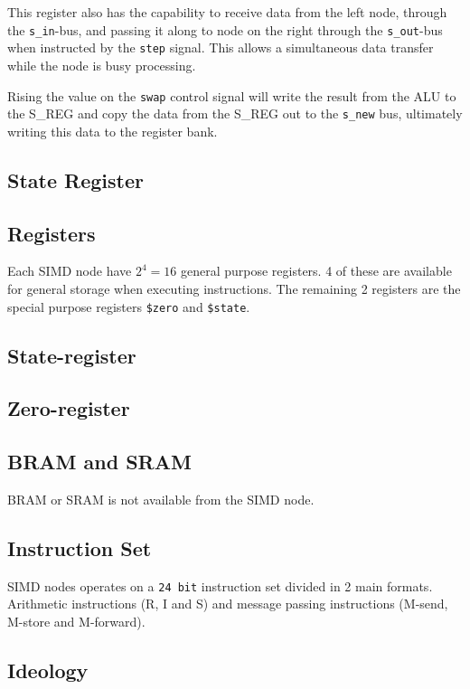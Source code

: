 This register also has the capability to receive data from the left node,
through the {\tt s\_in}-bus, and passing it along to node on the right through
the {\tt s\_out}-bus when instructed by the {\tt step} signal. This allows a
simultaneous data transfer while the node is busy processing.

Rising the value on the {\tt swap} control signal will write the result from the
ALU to the S\_REG and copy the data from the S\_REG out to the {\tt s\_new} bus,
ultimately writing this data to the register bank.

\subsection{State Register}

\subsection{Registers}
Each SIMD node have $2^4 = 16$ general purpose registers. 4 of these are
available for general storage when executing instructions. The remaining 2
registers are the special purpose registers {\tt \$zero} and {\tt \$state}.



\subsection{State-register}

\subsection{Zero-register}

\subsection{BRAM and SRAM}
BRAM or SRAM is not available from the SIMD node.

\subsection{Instruction Set}
SIMD nodes operates on a {\tt 24 bit} instruction set divided in 2 main
formats. Arithmetic instructions (R, I and S) and message passing instructions
(M-send, M-store and M-forward).

\subsection{Ideology}

